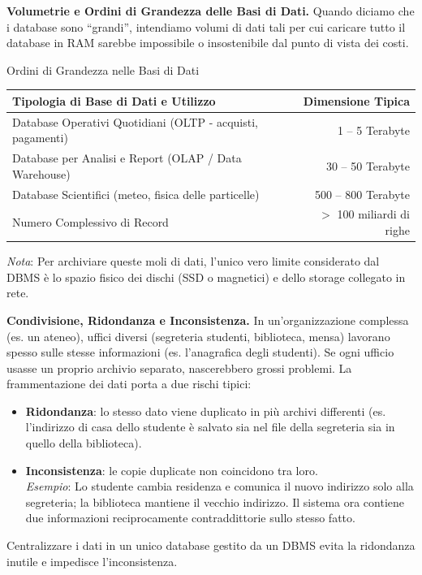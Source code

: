 \documentclass[12pt]{extarticle}
\begin{document}
\medskip
\noindent \textbf{Volumetrie e Ordini di Grandezza delle Basi di Dati.} Quando diciamo che i database sono ``grandi'', intendiamo volumi di dati tali per cui caricare tutto il database in RAM sarebbe impossibile o insostenibile dal punto di vista dei costi.

\begin{cbox}{Ordini di Grandezza nelle Basi di Dati}
\begin{center}
\begin{tabular}{lr}
    \toprule
    Tipologia di Base di Dati e Utilizzo & Dimensione Tipica \\
    \midrule
    Database Operativi Quotidiani (OLTP - acquisti, pagamenti) & 1 -- 5 Terabyte \\
    Database per Analisi e Report (OLAP / Data Warehouse) & 30 -- 50 Terabyte \\
    Database Scientifici (meteo, fisica delle particelle) & 500 -- 800 Terabyte \\
    Numero Complessivo di Record & $>$ 100 miliardi di righe \\
    \bottomrule
\end{tabular}
\end{center}
\medskip
\noindent \textit{Nota}: Per archiviare queste moli di dati, l'unico vero limite considerato dal DBMS è lo spazio fisico dei dischi (SSD o magnetici) e dello storage collegato in rete.
\end{cbox}

\medskip
\noindent \textbf{Condivisione, Ridondanza e Inconsistenza.} In un'organizzazione complessa (es. un ateneo), uffici diversi (segreteria studenti, biblioteca, mensa) lavorano spesso sulle stesse informazioni (es. l'anagrafica degli studenti). Se ogni ufficio usasse un proprio archivio separato, nascerebbero grossi problemi. La frammentazione dei dati porta a due rischi tipici:
\begin{itemize}
    \item \textbf{Ridondanza}: lo stesso dato viene duplicato in più archivi differenti (es. l'indirizzo di casa dello studente è salvato sia nel file della segreteria sia in quello della biblioteca).
    \item \textbf{Inconsistenza}: le copie duplicate non coincidono tra loro. \\
    \textit{Esempio}: Lo studente cambia residenza e comunica il nuovo indirizzo solo alla segreteria; la biblioteca mantiene il vecchio indirizzo. Il sistema ora contiene due informazioni reciprocamente contraddittorie sullo stesso fatto.
\end{itemize}
\noindent Centralizzare i dati in un unico database gestito da un DBMS evita la ridondanza inutile e impedisce l'inconsistenza.
\end{document}
